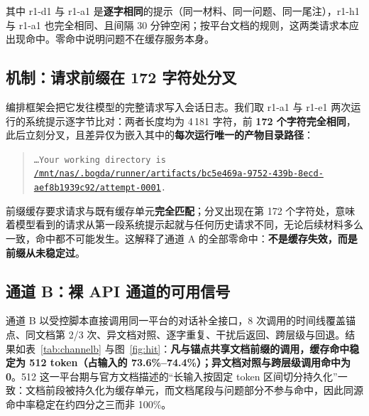 \documentclass[11pt, a4paper]{ctexart}
\begin{document}
其中 r1-d1 与 r1-a1 是\textbf{逐字相同}的提示（同一材料、同一问题、同一尾注），r1-h1 与 r1-a1 也完全相同、且间隔 30 分钟空闲；按平台文档的规则，这两类请求本应出现命中\cite{deepseekcache}。零命中说明问题不在缓存服务本身。

\subsection{机制：请求前缀在 172 字符处分叉}
\label{sec:results-mechanism}

编排框架会把它发往模型的完整请求写入会话日志。我们取 r1-a1 与 r1-e1 两次运行的系统提示逐字节比对：两者长度均为 4\,181 字符，前 \textbf{172 个字符完全相同}，此后立刻分叉，且差异仅为嵌入其中的\textbf{每次运行唯一的产物目录路径}：

\begin{quote}\small
\raggedright
\texttt{…Your working directory is \url{/mnt/nas/.bogda/runner/artifacts/bc5e469a-9752-439b-8ecd-aef8b1939c92/attempt-0001}.}
\end{quote}

前缀缓存要求请求与既有缓存单元\textbf{完全匹配}；分叉出现在第 172 个字符处，意味着模型看到的请求从第一段系统提示起就与任何历史请求不同，无论后续材料多么一致，命中都不可能发生。这解释了通道 A 的全部零命中：\textbf{不是缓存失效，而是前缀从未稳定过}。

\subsection{通道 B：裸 API 通道的可用信号}
\label{sec:results-b}

通道 B 以受控脚本直接调用同一平台的对话补全接口，8 次调用的时间线覆盖锚点、同文档第 2/3 次、异文档对照、逐字重复、干扰后返回、跨层级与回退。结果如表~\ref{tab:channelb} 与图~\ref{fig:hit}：\textbf{凡与锚点共享文档前缀的调用，缓存命中稳定为 512 token（占输入的 73.6\%--74.4\%）；异文档对照与跨层级调用命中为 0}。512 这一平台期与官方文档描述的“长输入按固定 token 区间切分持久化”一致\cite{deepseekcache}：文档前段被持久化为缓存单元，而文档尾段与问题部分不参与命中，因此同源命中率稳定在约四分之三而非 100\%。
\end{document}
